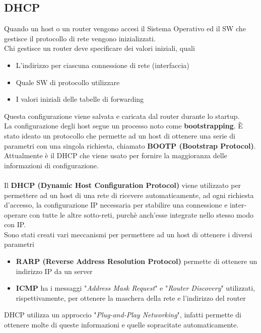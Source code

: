\documentclass{article}
\begin{document}
        \subsection{DHCP}
            Quando un host o un router vengono accesi il Sistema Operativo ed il SW che gestisce il protocollo di rete vengono inizializzati.\\
            Chi gestisce un router deve specificare dei valori iniziali, quali
            \begin{itemize}
                \item L'indirizzo per ciascuna connessione di rete (interfaccia)
                \item Quale SW di protocollo utilizzare
                \item I valori iniziali delle tabelle di forwarding
            \end{itemize}
            Questa configurazione viene salvata e caricata dal router durante lo startup.\\
            La configurazione degli host segue un processo noto come \textbf{bootstrapping}. È stato ideato un protocollo che permette ad un host di ottenere una serie di parametri con una singola richiesta, chiamato \textbf{BOOTP (Bootstrap Protocol)}.\\
            Attualmente è il DHCP che viene usato per fornire la maggioranza delle informazioni di configurazione.\\
            \\
            Il \textbf{DHCP (Dynamic Host Configuration Protocol)} viene utilizzato per permettere ad un host di una rete di ricevere automaticamente, ad ogni richiesta d'accesso, la configurazione IP necessaria per stabilire una connessione e inter-operare con tutte le altre sotto-reti, purchè anch'esse integrate nello stesso modo con IP.\\
            Sono stati creati vari meccanismi per permettere ad un host di ottenere i diversi parametri
            \begin{itemize}
                \item \textbf{RARP (Reverse Address Resolution Protocol)} permette di ottenere un indirizzo IP da un server
                \item \textbf{ICMP} ha i messaggi "\textit{Address Mask Request}" e "\textit{Router Discovery}" utilizzati, rispettivamente, per ottenere la maschera della rete e l'indirizzo del router 
            \end{itemize}
            DHCP utilizza un approccio "\textit{Plug-and-Play Networking}", infatti permette di ottenere molte di queste informazioni e quelle sopracitate automaticamente.\\
\end{document}
